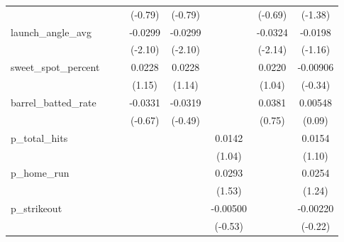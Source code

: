 {\begin{tabular}{l*{7}{c}}
            &                     &                     &     (-0.79)         &     (-0.79)         &                     &     (-0.69)         &     (-1.38)         \\
[1em]
launch\_angle\_avg&                     &                     &     -0.0299\sym{*}  &     -0.0299\sym{*}  &                     &     -0.0324\sym{*}  &     -0.0198         \\
            &                     &                     &     (-2.10)         &     (-2.10)         &                     &     (-2.14)         &     (-1.16)         \\
[1em]
sweet\_spot\_percent&                     &                     &      0.0228         &      0.0228         &                     &      0.0220         &    -0.00906         \\
            &                     &                     &      (1.15)         &      (1.14)         &                     &      (1.04)         &     (-0.34)         \\
[1em]
barrel\_batted\_rate&                     &                     &     -0.0331         &     -0.0319         &                     &      0.0381         &     0.00548         \\
            &                     &                     &     (-0.67)         &     (-0.49)         &                     &      (0.75)         &      (0.09)         \\
[1em]
p\_total\_hits&                     &                     &                     &                     &      0.0142         &                     &      0.0154         \\
            &                     &                     &                     &                     &      (1.04)         &                     &      (1.10)         \\
[1em]
p\_home\_run  &                     &                     &                     &                     &      0.0293         &                     &      0.0254         \\
            &                     &                     &                     &                     &      (1.53)         &                     &      (1.24)         \\
[1em]
p\_strikeout &                     &                     &                     &                     &    -0.00500         &                     &    -0.00220         \\
            &                     &                     &                     &                     &     (-0.53)         &                     &     (-0.22)         \\

\end{tabular}}
